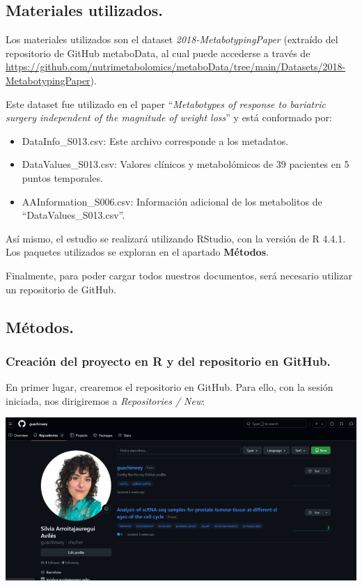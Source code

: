 \documentclass[
]{article}
\begin{document}
\subsection{Materiales utilizados.}\label{materiales-utilizados.}

Los materiales utilizados son el dataset \emph{2018-MetabotypingPaper}
(extraído del repositorio de GitHub metaboData, al cual puede accederse
a través de
\url{https://github.com/nutrimetabolomics/metaboData/tree/main/Datasets/2018-MetabotypingPaper}).

Este dataset fue utilizado en el paper ``\emph{Metabotypes of response
to bariatric surgery independent of the magnitude of weight loss}'' y
está conformado por:

\begin{itemize}
\item
  DataInfo\_S013.csv: Este archivo corresponde a los metadatos.
\item
  DataValues\_S013.csv: Valores clínicos y metabolómicos de 39 pacientes
  en 5 puntos temporales.
\item
  AAInformation\_S006.csv: Información adicional de los metabolitos de
  ``DataValues\_S013.csv''.
\end{itemize}

Así mismo, el estudio se realizará utilizando RStudio, con la versión de
R 4.4.1. Los paquetes utilizados se exploran en el apartado
\textbf{Métodos}.

Finalmente, para poder cargar todos nuestros documentos, será necesario
utilizar un repositorio de GitHub.

\subsection{Métodos.}\label{muxe9todos.}

\subsubsection{Creación del proyecto en R y del repositorio en
GitHub.}\label{creaciuxf3n-del-proyecto-en-r-y-del-repositorio-en-github.}

En primer lugar, crearemos el repositorio en GitHub. Para ello, con la
sesión iniciada, nos dirigiremos a \emph{Repositories / New}:

\includegraphics{images/clipboard-3636223962.png}
\end{document}
